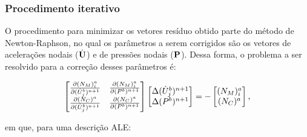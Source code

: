 \documentclass[_ArquivoPrincipal.tex]{subfiles}
\begin{document}
\subsubsection{Procedimento iterativo} \label{Comp-VMS}

O procedimento para minimizar os vetores resíduo obtido parte do método de Newton-Raphson, no qual os parâmetros a serem corrigidos são os vetores de acelerações nodais ($\dot{\mathbf{U}}$) e de pressões nodais ($\mathbf{P}$). Dessa forma, o problema a ser resolvido para a correção desses parâmetros é:

\begin{equation}
    \begin{bmatrix}
        \frac{\partial{(N_M)_i^a}}{\partial{(\dot{U}_j^b)^{n+1}}} & \frac{\partial{(N_M)_i^a}}{\partial{(P^b)^{n+1}}} \\
        \frac{\partial{(N_C)^a}}{\partial{(\dot{U}_j^b)^{n+1}}}   & \frac{\partial{(N_C)^a}}{\partial{(P^b)^{n+1}}}
    \end{bmatrix}
    \begin{bmatrix}
        \Delta(\dot{U}_j^b)^{n+1} \\
        \Delta (P^b)^{n+1}
    \end{bmatrix}=-
    \begin{bmatrix}
        (N_M)_i^a \\
        (N_C)^a
    \end{bmatrix}\text{,}
    \label{Eq:Newton-Raphson}
\end{equation}

\noindent em que, para uma descrição ALE:
\end{document}
